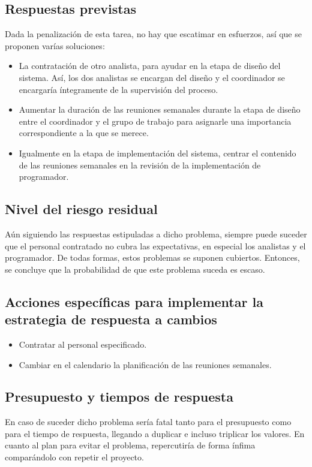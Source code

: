 \documentclass[11pt,a4paper,spanish,twoside]{book}
\begin{document}
\subsection{Respuestas previstas}
Dada la penalización de esta tarea, no hay que escatimar en esfuerzos, así
que se proponen varías soluciones:
\begin{itemize}
\item La contratación de otro analista, para ayudar en la etapa de diseño del
  sistema. Así, los dos analistas se encargan del diseño y el coordinador se
  encargaría íntegramente de la supervisión del proceso.
\item Aumentar la duración de las reuniones semanales durante la etapa de
  diseño entre el coordinador y el grupo de trabajo para asignarle una
  importancia correspondiente a la que se merece.
\item Igualmente en la etapa de implementación del sistema, centrar el
  contenido de las reuniones semanales en la revisión de la implementación de
  programador.
\end{itemize}

\subsection{Nivel del riesgo residual}
Aún siguiendo las respuestas estipuladas a dicho problema, siempre puede
suceder que el personal contratado no cubra las expectativas, en especial los
analistas y el programador. De todas formas, estos problemas se suponen
cubiertos. Entonces, se concluye que la probabilidad de que este problema
suceda es escaso.

\subsection{Acciones específicas para implementar la estrategia de respuesta
  a cambios}
\begin{itemize}
\item Contratar al personal especificado.
\item Cambiar en el calendario la planificación de las reuniones semanales.
\end{itemize}

\subsection{Presupuesto y tiempos de respuesta}
En caso de suceder dicho problema sería fatal tanto para el presupuesto como
para el tiempo de respuesta, llegando a duplicar e incluso triplicar los
valores. En cuanto al plan para evitar el problema, repercutiría de forma
ínfima comparándolo con repetir el proyecto. 
\end{document}
